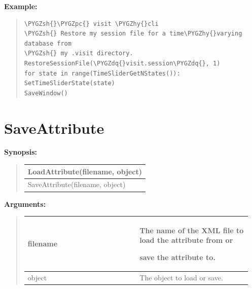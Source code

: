 \documentclass[letterpaper,10pt,english]{sphinxmanual}
\def\PYGZsh{\char`\#}
\def\PYGZpc{\char`\%}
\def\PYGZhy{\char`\-}
\def\PYGZdq{\char`\"}
\begin{document}
\begin{DUlineblock}{0em}
\item[] 
\end{DUlineblock}

\begin{DUlineblock}{0em}
\item[] \textbf{Example:}
\item[] 
\end{DUlineblock}
\begin{quote}

\begin{Verbatim}[commandchars=\\\{\}]
\PYGZsh{}\PYGZpc{} visit \PYGZhy{}cli
\PYGZsh{} Restore my session file for a time\PYGZhy{}varying database from
\PYGZsh{} my .visit directory.
RestoreSessionFile(\PYGZdq{}visit.session\PYGZdq{}, 1)
for state in range(TimeSliderGetNStates()):
SetTimeSliderState(state)
SaveWindow()
\end{Verbatim}
\end{quote}


\section{SaveAttribute}
\label{functions:saveattribute}
\begin{DUlineblock}{0em}
\item[] \textbf{Synopsis:}
\end{DUlineblock}
\begin{quote}

\begin{tabulary}{\linewidth}{|L|}
\hline

LoadAttribute(filename, object)
\\
\hline
SaveAttribute(filename, object)
\\
\hline\end{tabulary}

\end{quote}

\begin{DUlineblock}{0em}
\item[] 
\item[] \textbf{Arguments:}
\end{DUlineblock}
\begin{quote}

\begin{tabular}{|p{0.475\linewidth}|p{0.475\linewidth}|}
\hline

filename
 & 
\begin{DUlineblock}{0em}
\item[] The name of the XML file to load the attribute from or
\item[] save the attribute to.
\end{DUlineblock}
\\
\hline
object
 & 
The object to load or save.
\\
\hline\end{tabular}

\end{quote}
\end{document}
